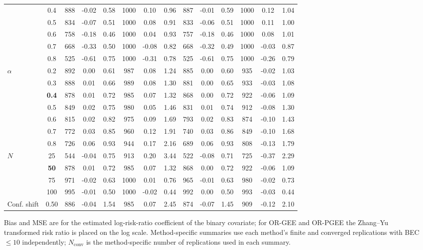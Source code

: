 \begin{table}[htbp]
\begin{tabular}{l c *{4}{S[table-format=4.0] S[table-format=-2.2] S[table-format=5.2]}}
 & 0.4 & 888 & -0.02 & 0.58 & 1000 & 0.10 & 0.96 & 887 & -0.01 & 0.59 & 1000 & 0.12 & 1.04 \\
 & 0.5 & 834 & -0.07 & 0.51 & 1000 & 0.08 & 0.91 & 833 & -0.06 & 0.51 & 1000 & 0.11 & 1.00 \\
 & 0.6 & 758 & -0.18 & 0.46 & 1000 & 0.04 & 0.93 & 757 & -0.18 & 0.46 & 1000 & 0.08 & 1.01 \\
 & 0.7 & 668 & -0.33 & 0.50 & 1000 & -0.08 & 0.82 & 668 & -0.32 & 0.49 & 1000 & -0.03 & 0.87 \\
 & 0.8 & 525 & -0.61 & 0.75 & 1000 & -0.31 & 0.78 & 525 & -0.61 & 0.75 & 1000 & -0.26 & 0.79 \\
\midrule
$\alpha$ & 0.2 & 892 & 0.00 & 0.61 & 987 & 0.08 & 1.24 & 885 & 0.00 & 0.60 & 935 & -0.02 & 1.03 \\
 & 0.3 & 888 & 0.01 & 0.66 & 989 & 0.08 & 1.30 & 881 & 0.00 & 0.65 & 933 & -0.03 & 1.08 \\
 & \textbf{0.4} & 878 & 0.01 & 0.72 & 985 & 0.07 & 1.32 & 868 & 0.00 & 0.72 & 922 & -0.06 & 1.09 \\
 & 0.5 & 849 & 0.02 & 0.75 & 980 & 0.05 & 1.46 & 831 & 0.01 & 0.74 & 912 & -0.08 & 1.30 \\
 & 0.6 & 815 & 0.02 & 0.82 & 975 & 0.09 & 1.69 & 793 & 0.02 & 0.83 & 874 & -0.10 & 1.43 \\
 & 0.7 & 772 & 0.03 & 0.85 & 960 & 0.12 & 1.91 & 740 & 0.03 & 0.86 & 849 & -0.10 & 1.68 \\
 & 0.8 & 726 & 0.06 & 0.93 & 944 & 0.17 & 2.16 & 689 & 0.06 & 0.93 & 808 & -0.13 & 1.79 \\
\midrule
$N$ & 25 & 544 & -0.04 & 0.75 & 913 & 0.20 & 3.44 & 522 & -0.08 & 0.71 & 725 & -0.37 & 2.29 \\
 & \textbf{50} & 878 & 0.01 & 0.72 & 985 & 0.07 & 1.32 & 868 & 0.00 & 0.72 & 922 & -0.06 & 1.09 \\
 & 75 & 971 & -0.02 & 0.63 & 1000 & 0.01 & 0.76 & 965 & -0.01 & 0.63 & 980 & -0.02 & 0.73 \\
 & 100 & 995 & -0.01 & 0.50 & 1000 & -0.02 & 0.44 & 992 & 0.00 & 0.50 & 993 & -0.03 & 0.44 \\
\midrule
Conf. shift & 0.50 & 886 & -0.04 & 1.54 & 985 & 0.07 & 2.45 & 874 & -0.07 & 1.45 & 909 & -0.12 & 2.10 \\
\bottomrule
\end{tabular}
\begin{flushleft}
\footnotesize Bias and MSE are for the estimated log-risk-ratio coefficient of the binary covariate; for OR-GEE and OR-PGEE the Zhang--Yu transformed risk ratio is placed on the log scale. Method-specific summaries use each method's finite and converged replications with BEC $\leq 10$ independently; $N_{\mathrm{conv}}$ is the method-specific number of replications used in each summary.
\end{flushleft}
\end{table}
